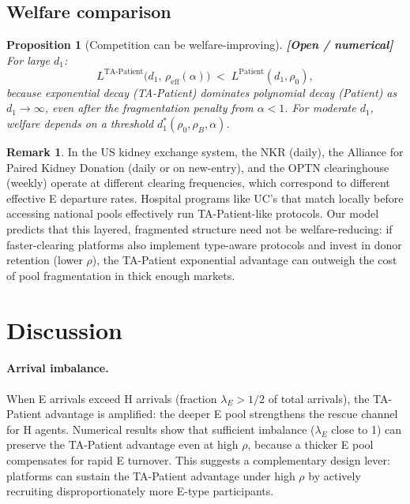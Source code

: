 \documentclass{article}
\theoremstyle{plain}
\newtheorem{proposition}{Proposition}
\theoremstyle{definition}
\newtheorem{remark}{Remark}
\newcommand{\open}{\textcolor{openred}{\textbf{[Open / numerical]}}\,}
\begin{document}
\subsection{Welfare comparison}

\begin{proposition}[Competition can be welfare-improving]
\label{prop:competition}
\open For large $d_1$:
\[
  L^{\mathrm{TA\text{-}Patient}}\bigl(d_1,\,\rho_{\mathrm{eff}}(\alpha)\bigr)
  \;<\;
  L^{\mathrm{Patient}}(d_1,\rho_0),
\]
because exponential decay (TA-Patient) dominates polynomial decay (Patient)
as $d_1\to\infty$, even after the fragmentation penalty from $\alpha<1$.
For moderate $d_1$, welfare depends on a threshold
$d_1^*(\rho_0,\rho_B,\alpha)$.
\end{proposition}

\begin{remark}
In the US kidney exchange system, the NKR (daily), the Alliance for Paired
Kidney Donation (daily or on new-entry), and the OPTN clearinghouse (weekly)
operate at different clearing frequencies, which correspond to different
effective E departure rates.  Hospital programs like UC's that match locally
before accessing national pools effectively run TA-Patient-like protocols.
Our model predicts that this layered, fragmented structure need not be
welfare-reducing: if faster-clearing platforms also implement type-aware
protocols and invest in donor retention (lower $\rho$), the TA-Patient
exponential advantage can outweigh the cost of pool fragmentation in thick
enough markets.
\end{remark}

\section{Discussion}
\label{sec:discussion}

\paragraph{Arrival imbalance.}
When E arrivals exceed H arrivals (fraction $\lambda_E>1/2$ of total
arrivals), the TA-Patient advantage is amplified: the deeper E pool
strengthens the rescue channel for H agents.  Numerical results show that
sufficient imbalance ($\lambda_E$ close to 1) can preserve the TA-Patient
advantage even at high $\rho$, because a thicker E pool compensates for
rapid E turnover.  This suggests a complementary design lever: platforms can
sustain the TA-Patient advantage under high $\rho$ by actively recruiting
disproportionately more E-type participants.
\end{document}
